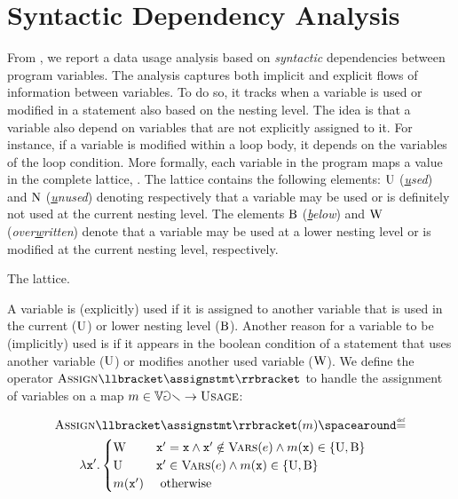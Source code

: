 \section{Syntactic Dependency Analysis}

From , we report a data usage analysis based on \emph{syntactic} dependencies between program variables.
The analysis captures both implicit and explicit flows of information between variables.
To do so, it tracks when a variable is used or modified in a statement also based on the nesting level. The idea is that a variable also depend on variables that are not explicitly assigned to it.
For instance, if a variable is modified within a loop body, it depends on the variables of the loop condition.
More formally, each variable in the program maps a value in the \usage{} complete lattice, .
The lattice contains the following elements: $\textup{U}$ (\emph{\underline{u}sed}) and $\textup{N}$ (\emph{\underline{u}nused}) denoting respectively that a variable may be used or is definitely not used at the current nesting level.
The elements $\textup{B}$ (\emph{\underline{b}elow}) and $\textup{W}$ (\emph{over\underline{w}ritten}) denote that a variable may be used at a lower nesting level or is modified at the current nesting level, respectively.

\begin{marginfigure}
  \centering
  \caption{The \usage{} lattice.}
\end{marginfigure}

A variable is (explicitly) used if it is assigned to another variable that is used in the current ($\textup{U}$) or lower nesting level ($\textup{B}$). Another reason for a variable to be (implicitly) used is if it appears in the boolean condition of a statement that uses another variable ($\textup{U}$) or modifies another used variable ($\textup{W}$).
We define the operator $\usageassign\semanticsof{\assignstmt}$ to handle the assignment of variables on a map $m\in\mathbb{Var}\to\textsc{Usage}$:


\begin{align*}
  & \usageassign\semanticsof{\assignstmt}(\usagemap) \DefeQ \\
  &\qquad \lambda \defvariable'.
  \begin{cases}
    \overwrittentag & \defvariable' = \defvariable \land \defvariable' \notin \variablesof{\defaexp} \land \usagemap(\defvariable) \in\{ \usedtag, \belowtag\} \\
    \usedtag & \defvariable' \in \variablesof{\defaexp} \land \usagemap(\defvariable) \in \{ \usedtag, \belowtag\} \\
    \usagemap(\defvariable') & \text{ otherwise}
  \end{cases}
\end{align*}

